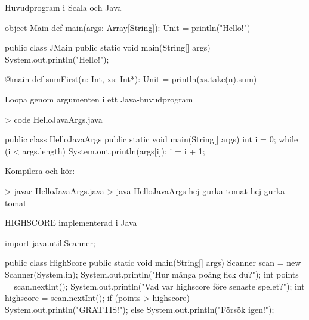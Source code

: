 \begin{Slide}{Huvudprogram i Scala och Java}
\begin{multicols}{2}
  \noindent{}
\begin{CodeSmall}[basicstyle=\footnotesize\ttfamily\SlideFontSize{6}{8},backgroundcolor=\color{white},
  frame=none]
object Main {
  def main(args: Array[String]): Unit = {
    println("Hello!")
  }
}
\end{CodeSmall}

\columnbreak

\noindent{}
\begin{CodeSmall}[language=Java,basicstyle=\footnotesize\ttfamily\SlideFontSize{6}{8},backgroundcolor=\color{white},
  frame=none]
public class JMain {
  public static void main(String[] args){
    System.out.println("Hello!");
  }
}
\end{CodeSmall}
\end{multicols}

\pause\vspace{1em}\noindent{}
\begin{CodeSmall}[basicstyle=\footnotesize\ttfamily\SlideFontSize{6}{8},backgroundcolor=\color{white},
  frame=none]
@main 
def sumFirst(n: Int, xs: Int*): Unit = println(xs.take(n).sum)
  
\end{CodeSmall}

\end{Slide}


\begin{Slide}{Loopa genom argumenten i ett Java-huvudprogram}
\begin{REPLnonum}
> code HelloJavaArgs.java
\end{REPLnonum}
\begin{Code}[language=Java]
public class HelloJavaArgs {
    public static void main(String[] args) {
    int i = 0;
    while (i < args.length) {
      System.out.println(args[i]);
      i = i + 1;
    }
  }
}
\end{Code}
Kompilera och kör:
\begin{REPL}
> javac HelloJavaArgs.java
> java HelloJavaArgs hej gurka tomat
hej
gurka
tomat
\end{REPL}
\end{Slide}


\begin{Slide}{HIGHSCORE implementerad i Java}
\begin{Code}[language=Java]
import java.util.Scanner;

public class HighScore {
    public static void main(String[] args){
        Scanner scan = new Scanner(System.in);
        System.out.println("Hur många poäng fick du?");
        int points =  scan.nextInt();
        System.out.println("Vad var highscore före senaste spelet?");
        int highscore = scan.nextInt();
        if (points > highscore) {
            System.out.println("GRATTIS!");
        } else {
            System.out.println("Försök igen!");
        }
    }
}
\end{Code}
\end{Slide}



